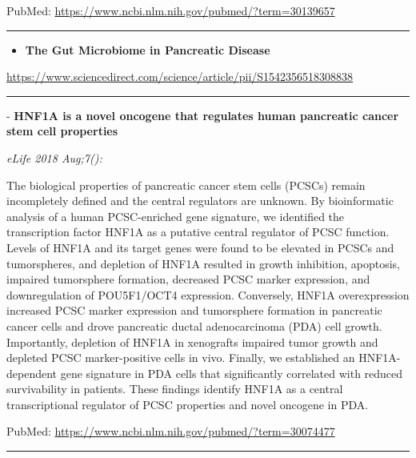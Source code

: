 \documentclass[]{article}
\providecommand{\tightlist}{%
  \setlength{\itemsep}{0pt}\setlength{\parskip}{0pt}}
\begin{document}
PubMed: \url{https://www.ncbi.nlm.nih.gov/pubmed/?term=30139657}

{}

{}

\begin{center}\rule{0.5\linewidth}{\linethickness}\end{center}

\begin{itemize}
\tightlist
\item
  \textbf{The Gut Microbiome in Pancreatic Disease}
\end{itemize}

\url{https://www.sciencedirect.com/science/article/pii/S1542356518308838}

\begin{center}\rule{0.5\linewidth}{\linethickness}\end{center}

 - \textbf{HNF1A is a novel oncogene that regulates human pancreatic
cancer stem cell properties}

\emph{eLife 2018 Aug;7():}

The biological properties of pancreatic cancer stem cells (PCSCs) remain
incompletely defined and the central regulators are unknown. By
bioinformatic analysis of a human PCSC-enriched gene signature, we
identified the transcription factor HNF1A as a putative central
regulator of PCSC function. Levels of HNF1A and its target genes were
found to be elevated in PCSCs and tumorspheres, and depletion of HNF1A
resulted in growth inhibition, apoptosis, impaired tumorsphere
formation, decreased PCSC marker expression, and downregulation of
POU5F1/OCT4 expression. Conversely, HNF1A overexpression increased PCSC
marker expression and tumorsphere formation in pancreatic cancer cells
and drove pancreatic ductal adenocarcinoma (PDA) cell growth.
Importantly, depletion of HNF1A in xenografts impaired tumor growth and
depleted PCSC marker-positive cells in vivo. Finally, we established an
HNF1A-dependent gene signature in PDA cells that significantly
correlated with reduced survivability in patients. These findings
identify HNF1A as a central transcriptional regulator of PCSC properties
and novel oncogene in PDA.

PubMed: \url{https://www.ncbi.nlm.nih.gov/pubmed/?term=30074477}

{}

{}

\begin{center}\rule{0.5\linewidth}{\linethickness}\end{center}
\end{document}
